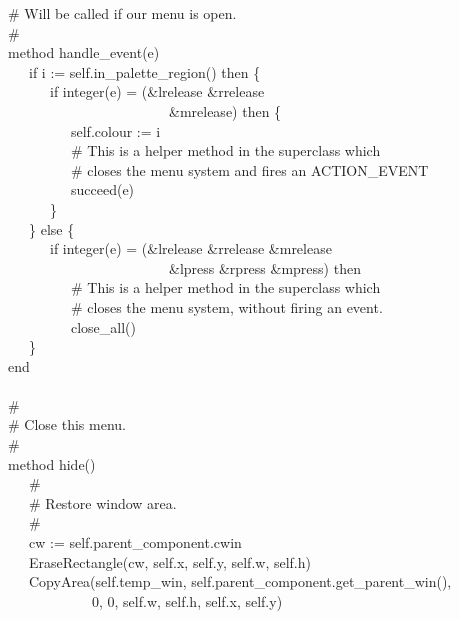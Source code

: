 {\>   \# Will be called if our menu is open. \\
\>   \# \\
\>   method handle\_event(e) \\
\>   \ \ \ if i := self.in\_palette\_region() then \{ \\
\>   \ \ \ \ \ \ if integer(e) = (\&lrelease {\textbar} \&rrelease
{\textbar}  \\
\>   \ \ \ \ \ \ \ \ \ \ \ \ \ \ \ \ \ \ \ \ \ \ \ \&mrelease) then \{ \\
\>   \ \ \ \ \ \ \ \ \ self.colour := i \\
\>   \ \ \ \ \ \ \ \ \ \# This is a helper method in the superclass which \\
\>   \ \ \ \ \ \ \ \ \ \# closes the menu system and fires an ACTION\_EVENT \\
\>   \ \ \ \ \ \ \ \ \ succeed(e) \\
\>   \ \ \ \ \ \ \} \\
\>   \ \ \ \} else \{ \\
\>   \ \ \ \ \ \ if integer(e) = (\&lrelease {\textbar} \&rrelease
{\textbar} \&mrelease {\textbar} \\
\>   \ \ \ \ \ \ \ \ \ \ \ \ \ \ \ \ \ \ \ \ \ \ \ \&lpress {\textbar}
\&rpress {\textbar} \&mpress) then \\
\>   \ \ \ \ \ \ \ \ \ \# This is a helper method in the superclass
which \\
\>   \ \ \ \ \ \ \ \ \ \# closes the menu system, without firing an
event. \\
\>   \ \ \ \ \ \ \ \ \ close\_all() \\
\>   \ \ \ \} \\
\>   end \\
\ \\
\>   \# \\
\>   \# Close this menu. \\
\>   \# \\
\>   method hide() \\
\>   \ \ \ \# \\
\>   \ \ \ \# Restore window area. \\
\>   \ \ \ \# \\
\>   \ \ \ cw := self.parent\_component.cwin \\
\>   \ \ \ EraseRectangle(cw, self.x, self.y, self.w, self.h) \\
\>   \ \ \ CopyArea(self.temp\_win,
self.parent\_component.get\_parent\_win(), \\
\>   \ \ \ \ \ \ \ \ \ \ \ \ 0, 0, self.w, self.h, self.x, self.y) \\
}
